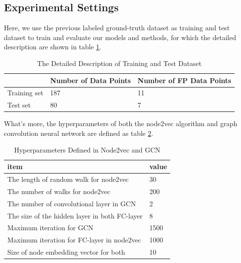\documentclass[sigconf, nonacm]{acmart}
\begin{document}
\subsection{Experimental Settings}
Here, we use the previous labeled ground-truth dataset as training and test dataset to train and evaluate our models and methods, for which the detailed description are shown in table \ref{tab:datas}.

\begin{table}[htbp]
\begin{tabular}{@{}lll@{}}
\toprule
             & Number of Data Points & Number of FP Data Points \\ \midrule
Training set & 187                   & 11                       \\
Test set     & 80                    & 7                        \\ \bottomrule
\end{tabular}
\caption{The Detailed Description of Training and Test Dataset}
\label{tab:datas}
\end{table}

What's more, the hyperparameters of both the node2vec algorithm and graph convolution neural network are defined as table \ref{tab:my-table}.

\begin{table}[htbp]
\begin{tabular}{@{}ll@{}}
\toprule
item                                          & value \\ \midrule
The length of random walk for node2vec        & 30    \\
The number of walks for node2vec              & 200   \\
The number of convolutional layer in GCN      & 2     \\
The size of the hidden layer in both FC-layer & 8     \\
Maximum iteration for GCN                     & 1500  \\
Maximum iteration for FC-layer in node2vec    & 1000  \\
Size of node embedding vector for both        & 10    \\\bottomrule
\end{tabular}
\caption{Hyperparameters Defined in Node2vec and GCN}
\label{tab:my-table}
\end{table}
\end{document}

